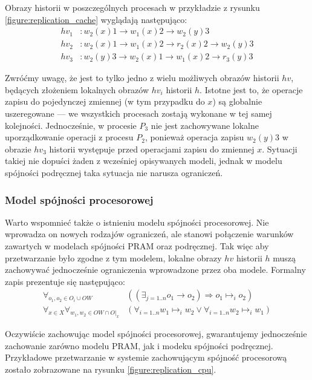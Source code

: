 Obrazy historii w poszczególnych procesach w przykładzie z rysunku \ref{figure:replication_cache} wyglądają następująco:
\begin{align*}
    hv_1&: w_2(x)1 \rightarrow w_1(x)2 \rightarrow w_2(y)3 \\
    hv_2&: w_2(x)1 \rightarrow w_1(x)2 \rightarrow r_2(x)2 \rightarrow w_2(y)3 \\
    hv_3&: w_2(y)3 \rightarrow w_2(x)1 \rightarrow w_1(x)2 \rightarrow r_3(y)3
\end{align*}

Zwróćmy uwagę, że jest to tylko jedno z wielu możliwych obrazów historii $ hv $, będących złożeniem lokalnych obrazów $ hv_i $ historii $ h $. Istotne jest to, że operacje zapisu do pojedynczej zmiennej (w tym przypadku do $ x $) są globalnie uszeregowane --- we wszystkich procesach zostają wykonane w tej samej kolejności. Jednocześnie, w procesie $ P_3 $ nie jest zachowywane lokalne uporządkowanie operacji z procesu $ P_2 $, ponieważ operacja zapisu $ w_2(y)3 $ w obrazie $ hv_3 $ historii występuje przed operacjami zapisu do zmiennej $ x $. Sytuacji takiej nie dopuści żaden z wcześniej opisywanych modeli, jednak w modelu spójności podręcznej taka sytuacja nie narusza ograniczeń.

\subsubsection{Model spójności procesorowej}

Warto wspomnieć także o istnieniu modelu spójności procesorowej. Nie wprowadza on nowych rodzajów ograniczeń, ale stanowi połączenie warunków zawartych w modelach spójności PRAM oraz podręcznej. Tak więc aby przetwarzanie było zgodne z tym modelem, lokalne obrazy $ hv$ historii $ h $ muszą zachowywać jednocześnie ograniczenia wprowadzone przez oba modele. Formalny zapis prezentuje się następująco:
\begin{align*}
    \forall_{o_1, o_2 \in O_i \cup OW} &((\exists_{j=1..n} o_1 \rightarrow o_2) \Rightarrow o_1 \mapsto_i o_2) \\
    \forall_{x \in X} \forall_{w_1, w_2 \in OW \cap O|_x} &(\forall_{i=1..n} w_1 \mapsto_i w_2 \vee \forall_{i=1..n} w_2 \mapsto_i w_1)
\end{align*}

Oczywiście zachowując model spójności procesorowej, gwarantujemy jednocześnie zachowanie zarówno modelu PRAM, jak i modeku spójności podręcznej. Przykładowe przetwarzanie w systemie zachowującym spójność procesorową zostało zobrazowane na rysunku \ref{figure:replication_cpu}.


